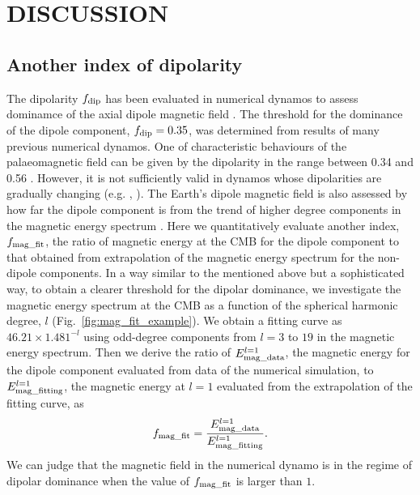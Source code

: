 \section{DISCUSSION}
\subsection{Another index of dipolarity}
\label{subsec:dipolarity}


The dipolarity $f_{\rm dip}$ has been evaluated in numerical dynamos to assess dominamce of the axial dipole magnetic field \citep{Uli:2006,Soderlund:2012}.
The threshold for the dominance of the dipole component, $f_{\rm dip} = 0.35$, was determined from results of many previous numerical dynamos.
One of characteristic behaviours of the palaeomagnetic field can be given by the dipolarity in the range between 0.34 and 0.56 \citep{Meduri:2021}.
However, it is not sufficiently valid in dynamos whose dipolarities are gradually changing (e.g. \citeauthor{Aubert:2009}, \citeyear{Aubert:2009}).
%
The Earth's dipole magnetic field is also assessed by how far the dipole component is from the trend of higher degree components in the magnetic energy spectrum \citep{Lowes:74,Langel:82}.
%
Here we quantitatively evaluate another index, $f_{\rm mag\_fit}$, the ratio of magnetic energy at the CMB for the dipole component to that obtained from extrapolation of the magnetic energy spectrum for the non-dipole components.
%
In a way similar to the mentioned above but a sophisticated way, to obtain a clearer threshold for the dipolar dominance, we investigate the magnetic energy spectrum at the CMB as a function of the spherical harmonic degree, $l$ (Fig.~\ref{fig:mag_fit_example}).
We obtain a fitting curve as $46.21 \times 1.481^{-l}$ using odd-degree components from $l = 3$ to $19$ in the magnetic energy spectrum.
Then we derive the ratio of $E_{\rm mag\_data}^{l=1}$, the magnetic energy for the dipole component evaluated from data of the numerical simulation, to $E_{\rm mag\_fitting}^{l=1}$, the magnetic energy at $l=1$ evaluated from the extrapolation of the fitting curve, as 
%
\begin{equation}
f_{\rm mag\_fit} = \frac{E_{\rm mag\_data}^{l=1} }{E_{\rm mag\_fitting}^{l=1}} .
\label{eq:def_f_mag_fit}
\end{equation}
%
We can judge that the magnetic field in the numerical dynamo is in the regime of dipolar dominance when the value of $f_{\rm mag\_fit}$ is larger than $1$.

